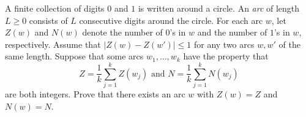 A finite collection of digits $0$ and $1$ is written around a circle.
An \emph{arc} of length $L \geq 0$ consists of $L$ consecutive digits around the circle. For each arc $w$, let $Z(w)$ and $N(w)$ denote the number of $0$'s in $w$ and the number of $1$'s in $w$, respectively.
Assume that $\left| Z(w) - Z(w') \right| \leq 1$ for any two arcs $w, w'$ of the same length. Suppose that some arcs $w_1,\dots,w_k$ have the property that
\[
Z = \frac{1}{k} \sum_{j=1}^k Z(w_j) \mbox{ and }
N = \frac{1}{k} \sum_{j=1}^k N(w_j)
\]
are both integers. Prove that there exists an arc $w$ with $Z(w) = Z$
and $N(w) = N$.
